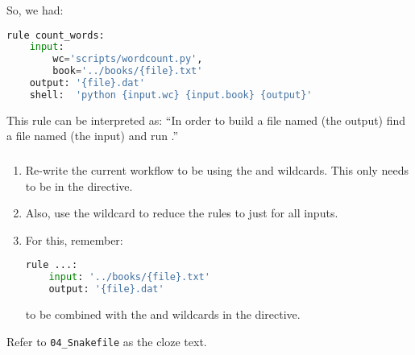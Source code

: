 \begin{frame}[fragile]
  So, we had:
    \begin{lstlisting}[language=Python,style=Python]
  rule count_words:
    input:
        wc='scripts/wordcount.py',
        book='../books/{file}.txt'
    output: '{file}.dat'
    shell:  'python {input.wc} {input.book} {output}'   
    \end{lstlisting}
    \begin{block}{This rule can be interpreted as:}
``In order to build a file named  (the output) find a file named  (the input) and run .''
  \end{block}
\end{frame}

\begingroup
{}
\begin{frame}[fragile]
  \frametitle{}
  \begin{enumerate}
   \item Re-write the current workflow to be using the  and  wildcards. This only needs to be in the  directive.
   \item Also, use the  wildcard to reduce the  rules to just  for all inputs.
   \item For this, remember:
         \begin{lstlisting}[language=Python,style=Python]
rule ...:
    input: '../books/{file}.txt'
    output: '{file}.dat'
         \end{lstlisting}
         to be combined with the  and  wildcards in the  directive.
  \end{enumerate}
  \begin{hint}
  	Refer to \texttt{04\_Snakefile} as the cloze text.
  \end{hint}
  \vfill
\end{frame}
\endgroup


